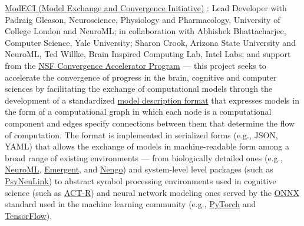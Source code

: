 \documentclass[10 pt]{article}
\begin{document}
\href{https://modeci.github.io/Website/}{ModECI (Model Exchange and Convergence Initiative)} \cite{gleeson2023integrating}: Lead Developer with Padraig Gleason, Neuroscience, Physiology and Pharmacology, University of College London and NeuroML; in collaboration with Abhishek Bhattacharjee, Computer Science, Yale University; Sharon Crook, Arizona State University and NeuroML, Ted Willke, Brain Inspired Computing Lab, Intel Labs; and support from the \href{https://www.nsf.gov/od/oia/convergence-accelerator/}{NSF Convergence Accelerator Program} — this project seeks to accelerate the convergence of progress in the brain, cognitive and computer sciences by facilitating the exchange of computational models through the development of a standardized \href{https://github.com/ModECI/MDF}{model description format} that expresses models in the form of a computational graph in which each node is a computational component and edges specify connections between them that determine the flow of computation. The format is implemented in serialized forms (e.g., JSON, YAML) that allows the exchange of models in machine-readable form among a broad range of existing environments — from biologically detailed ones (e.g., \href{https://neuroml.org}{NeuroML}, \href{https://grey.colorado.edu/emergent/index.php/Main_Page}{Emergent}, and \href{https://www.nengo.ai}{Nengo}) and system-level level packages (such as \href{http://psyneulink.org}{PsyNeuLink}) to abstract symbol processing environments used in cognitive science (such as \href{http://act-r.psy.cmu.edu}{ACT-R}) and neural network modeling ones served by the \href{https://onnx.ai}{ONNX} standard used in the machine learning community (e.g., \href{https://pytorch.org}{PyTorch} and \href{https://www.tensorflow.org}{TensorFlow}).
\end{document}
